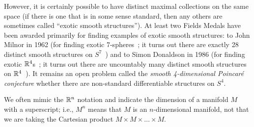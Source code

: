 
However, it is certainly possible to have distinct maximal collections on the same space (if there is one that is in some sense standard, then any others are sometimes called ``exotic smooth structures''). At least two Fields Medals have been awarded primarily for finding examples of exotic smooth structures: to John Milnor in 1962 (for finding exotic 7-spheres~\cite{milnorManifoldsHomeomorphic7sphere1956}; it turns out there are exactly 28 distinct smooth structures on $S^7$~\cite{kervaireGroupsHomotopySpheres1963a}) and to Simon Donaldson in 1986 (for finding exotic $\mathbb{R}^4$s~\cite{donaldsonApplicationGaugeTheory1983,freedmanTopologyFourdimensionalManifolds1982,gompfThreeExotic1983}; it turns out there are uncountably many distinct smooth structures on $\mathbb{R}^4$~\cite{taubesGaugeTheoryAsymptotically1987}). It remains an open problem called the \emph{smooth 4-dimensional Poincaré conjecture} whether there are non-standard differentiable structures on $S^4$.

\begin{remark}
	We often mimic the $\mathbb{R}^n$ notation and indicate the dimension of a manifold $M$ with a superscript; i.e., $M^n$ means that $M$ is an $n$-dimensional manifold, not that we are taking the Cartesian product $M \times M \times \dots \times M$.
\end{remark}

